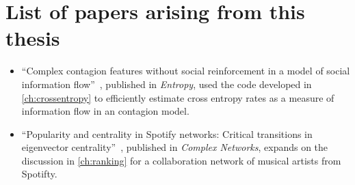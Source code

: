 \chapter{List of papers arising from this thesis}

\begin{itemize}
    \item ``Complex contagion features without social reinforcement in a model of social information flow''~\cite{pondComplexContagionFeatures2020}, published in \emph{Entropy}, used the code developed in \autoref{ch:crossentropy} to efficiently estimate cross entropy rates as a measure of information flow in an contagion model.
    \item ``Popularity and centrality in Spotify networks: Critical transitions in eigenvector centrality''~\cite{south_centrality_2021},  published in \emph{Complex Networks}, expands on the discussion in \autoref{ch:ranking} for a collaboration network of musical artists from Spotifty. 
\end{itemize}